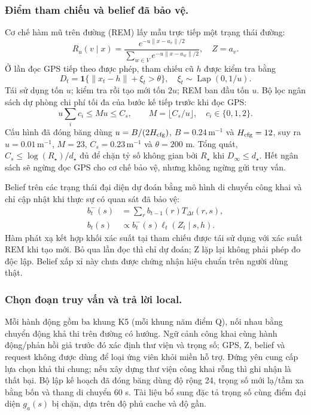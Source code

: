 \subsubsection{Điểm tham chiếu và belief đã bảo vệ.}
Cơ chế hàm mũ trên đường (REM) lấy mẫu trực tiếp một trạng thái đường:
\begin{equation}
R_u(v\mid x)=
\frac{e^{-u\|x-a_v\|/2}}{\sum_{w\in V}e^{-u\|x-a_w\|/2}},
\quad Z=a_v. \label{eq:rem}
\end{equation}
Ở lần đọc GPS tiếp theo được phép, tham chiếu cũ $h$ được kiểm tra bằng
\begin{equation}
D_t=\mathbf1\{\|x_t-h\|+\xi_t>\theta\},
\quad \xi_t\sim\operatorname{Lap}(0,1/u). \label{eq:test}
\end{equation}
Tái sử dụng tốn $u$; kiểm tra rồi tạo mới tốn $2u$; REM ban đầu tốn $u$.
Bộ lọc ngân sách dự phòng chi phí tối đa của bước kế tiếp trước khi đọc GPS:
\begin{equation}
u\sum_i c_i\le Mu\le C_s,\qquad
M=\lfloor C_s/u\rfloor,\quad c_i\in\{0,1,2\}. \label{eq:cap}
\end{equation}
Cấu hình đã đóng băng dùng $u=B/(2H_{\rm cfg})$,
$B=0.24\,\mathrm m^{-1}$ và $H_{\rm cfg}=12$, suy ra $u=0.01\,\mathrm m^{-1}$,
$M=23$, $C_s=0.23\,\mathrm m^{-1}$ và $\theta=200$ m.
Tổng quát, $C_s\le\log(R_\star)/d_\star$ đủ để chặn tỷ số không gian bởi
$R_\star$ khi $D_\infty\le d_\star$. Hết ngân sách sẽ ngừng đọc GPS cho cơ chế
bảo vệ, nhưng không ngừng gửi truy vấn.

Belief trên các trạng thái đại diện dự đoán bằng mô hình di chuyển công khai
và chỉ cập nhật khi thực sự có quan sát đã bảo vệ:
\begin{align}
b_t^-(s)&=\sum_r b_{t-1}(r)T_{\Delta t}(r,s),\\
b_t(s)&\propto b_t^-(s)\ell_t(Z_t\mid s,h). \label{eq:belief}
\end{align}
Hàm phát xạ kết hợp khối xác suất tại tham chiếu được tái sử dụng với xác suất
REM khi tạo mới. Bỏ qua lần đọc thì chỉ dự đoán; Z lặp lại không phải phép
đo độc lập. Belief xấp xỉ này chưa được chứng nhận hiệu chuẩn trên người dùng thật.

\subsubsection{Chọn đoạn truy vấn và trả lời local.}
Mỗi hành động gồm ba khung K5 (mỗi khung năm điểm Q), nối nhau bằng chuyển
động khả thi trên đường có hướng. Ngữ cảnh công khai cùng hành động/phản hồi
giả trước đó xác định thư viện và trọng số; GPS, Z, belief và request không
được dùng để loại ứng viên khỏi miền hỗ trợ. Đứng yên cung cấp lựa chọn khả
thi chung; nếu xây dựng thư viện công khai rỗng thì ghi nhận là thất bại.
Bộ lập kế hoạch đã đóng băng dùng độ rộng 24, trọng số mới lạ/tầm xa bằng bốn
và thang di chuyển 60 s. Tài liệu bổ sung đặc tả trọng số cùng điểm đại diện
$g_a(s)$ bị chặn, dựa trên độ phủ cache và độ gần.

